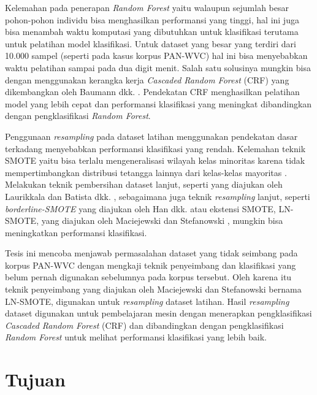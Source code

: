 Kelemahan pada penerapan \textit{Random Forest} yaitu walaupun sejumlah besar pohon-pohon individu bisa menghasilkan performansi yang tinggi, hal ini juga bisa menambah waktu komputasi yang dibutuhkan untuk klasifikasi terutama untuk pelatihan model klasifikasi.
Untuk dataset yang besar yang terdiri dari 10.000 sampel (seperti pada kasus korpus PAN-WVC) hal ini bisa menyebabkan waktu pelatihan sampai pada dua digit menit.
Salah satu solusinya mungkin bisa dengan menggunakan kerangka kerja \textit{Cascaded Random Forest} (CRF) yang dikembangkan oleh Baumann dkk. \cite{baumann2013cascaded}.
Pendekatan CRF menghasilkan pelatihan model yang lebih cepat dan performansi klasifikasi yang meningkat dibandingkan dengan pengklasifikasi \textit{Random Forest}.

Penggunaan \textit{resampling} pada dataset latihan menggunakan pendekatan dasar terkadang menyebabkan performansi klasifikasi yang rendah.
Kelemahan teknik SMOTE yaitu bisa terlalu mengeneralisasi wilayah kelas minoritas karena tidak mempertimbangkan distribusi tetangga lainnya dari kelas-kelas mayoritas \cite{maciejewski2011local}.
Melakukan teknik pembersihan dataset lanjut, seperti yang diajukan oleh Laurikkala \cite{laurikkala2001improving} dan Batista dkk. \cite{batista2004study}, sebagaimana juga teknik \textit{resampling} lanjut, seperti \textit{borderline-SMOTE} yang diajukan oleh Han dkk. \cite{han2005borderline} atau ekstensi SMOTE, LN-SMOTE, yang diajukan oleh Maciejewski dan Stefanowski \cite{maciejewski2011local}, mungkin bisa meningkatkan performansi klasifikasi.

Tesis ini mencoba menjawab permasalahan dataset yang tidak seimbang pada korpus PAN-WVC dengan mengkaji teknik penyeimbang dan klasifikasi yang belum pernah digunakan sebelumnya pada korpus tersebut.
Oleh karena itu teknik penyeimbang yang diajukan oleh Maciejewski dan Stefanowski \cite{maciejewski2011local} bernama LN-SMOTE, digunakan untuk \textit{resampling} dataset latihan.
Hasil \textit{resampling} dataset digunakan untuk pembelajaran mesin dengan menerapkan pengklasifikasi \textit{Cascaded Random Forest} (CRF) dan dibandingkan dengan pengklasifikasi \textit{Random Forest} untuk melihat performansi klasifikasi yang lebih baik.


\section{Tujuan}\label{sec:tujuan}

